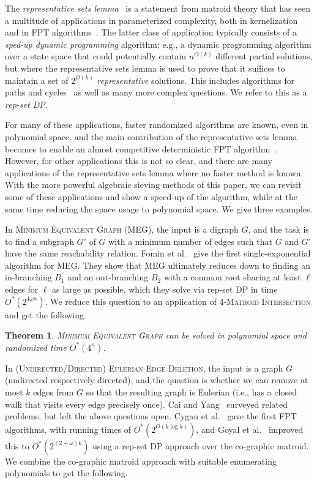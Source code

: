 \documentclass[10pt,a4paper]{article}
\newtheorem{theorem}{Theorem}[section]
\begin{document}
The \emph{representative sets lemma}~\cite{Lovasz1977,Marx09-matroid}
is a statement from matroid theory that has seen a multitude of
applications in parameterized complexity, both in kernelization~\cite{KratschW20JACM}
and in FPT algorithms~\cite{FominLPS16JACM,Marx09-matroid}. The latter
class of application typically consists of a \emph{sped-up dynamic programming}
algorithm; e.g., a dynamic programming algorithm over a state space
that could potentially contain $n^{O(k)}$ different partial solutions,
but where the representative sets lemma is used to prove that it
suffices to maintain a set of $2^{O(k)}$ \emph{representative}
solutions. This includes
algorithms for paths and cycles~\cite{FominLPS16JACM}
as well as many more complex questions.
We refer to this as a \emph{rep-set DP}.

For many of these applications, faster randomized algorithms are known, even in
polynomial space, and the main contribution
of the representative sets lemma becomes to enable an almost competitive 
deterministic FPT algorithm~\cite{FominLPS16JACM,Tsur19b}.
However, for other applications this is not so clear, and there are
many applications of the representative sets lemma where no faster
method is known.
With the more powerful algebraic sieving methods of this paper, 
we can revisit some of these applications and show a speed-up of the
algorithm, while at the same time reducing the space usage to
polynomial space. We give three examples.

In \textsc{Minimum Equivalent Graph} (MEG), the input is a
digraph $G$, and the task is to find a subgraph $G'$ of $G$ with a
minimum number of edges such that $G$ and $G'$ have the same
reachability relation. Fomin et al.~\cite{FominLPS16JACM} give the
first single-exponential algorithm for MEG.
They show that MEG ultimately reduces down to finding an in-branching
$B_1$ and an out-branching $B_2$ with a common root sharing at least
$\ell$ edges for $\ell$ as large as possible, which they solve via rep-set DP in time $O^*(2^{4 \omega n})$. 
We reduce this question to an application of
\textsc{4-Matroid Intersection} and get the following.

\begin{theorem} \label{ithm:MEG}
  \textsc{Minimum Equivalent Graph} can be solved in polynomial space
  and randomized time $O^*(4^{n})$. 
\end{theorem}

In \textsc{(Undirected/Directed) Eulerian Edge Deletion}, 
the input is a graph $G$ (undirected respectively directed),
and the question is whether we can remove at most $k$ edges from $G$
so that the resulting graph is Eulerian (i.e., has a closed walk that
visits every edge precisely once). Cai and Yang~\cite{CaiY11} surveyed
related problems, but left the above questions open. Cygan et al.~\cite{CyganMPPS14euler}
gave the first FPT algorithms, with running times of $O^*(2^{O(k \log k)})$,
and Goyal et al.~\cite{GoyalMPPS18even} improved this to $O^*(2^{(2+\omega)k})$
using a rep-set DP approach over the co-graphic matroid.
We combine the co-graphic matroid approach with suitable enumerating
polynomials to get the following.
\end{document}
